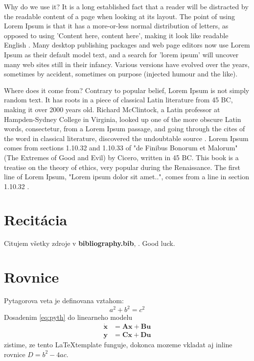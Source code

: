 Why do we use it? It is a long established fact that a reader will be distracted by the readable content of a page when looking at its layout. The point of using Lorem Ipsum is that it has a more-or-less normal distribution of letters, as opposed to using 'Content here, content here', making it look like readable English \cite{lipsum}. Many desktop publishing packages and web page editors now use Lorem Ipsum as their default model text, and a search for 'lorem ipsum' will uncover many web sites still in their infancy. Various versions have evolved over the years, sometimes by accident, sometimes on purpose (injected humour and the like).

Where does it come from? Contrary to popular belief, Lorem Ipsum is not simply random text. It has roots in a piece of classical Latin literature from 45 BC, making it over 2000 years old. Richard McClintock, a Latin professor at Hampden-Sydney College in Virginia, looked up one of the more obscure Latin words, consectetur, from a Lorem Ipsum passage, and going through the cites of the word in classical literature, discovered the undoubtable source \cite{lipsum}. Lorem Ipsum comes from sections 1.10.32 and 1.10.33 of "de Finibus Bonorum et Malorum" (The Extremes of Good and Evil) by Cicero, written in 45 BC. This book is a treatise on the theory of ethics, very popular during the Renaissance. The first line of Lorem Ipsum, "Lorem ipsum dolor sit amet..", comes from a line in section 1.10.32 \cite{lipsum}.

\section{Recitácia}
Citujem všetky zdroje v \textbf{bibliography.bib}, \cite{t00, t01, t02, t03, kniha, kniha2, kniha3, small, big, cs, koll, kap, tug, knuth, zbornik, prispevok}. \newline Good luck.

\section{Rovnice}
Pytagorova veta je definovana vztahom:
\begin{equation}
    a^2 + b^2 = c^2
    \label{eq:pyth}
\end{equation}
Dosadenim \eqref{eq:pyth} do linearneho modelu
\begin{align}
    \dot{\mathbf{x}} &= \mathbf{A} \mathbf{x} + \mathbf{B} \mathbf{u} \\
    \mathbf{y} &= \mathbf{C} \mathbf{x} + \mathbf{D} \mathbf{u}
    \label{eq:model}
\end{align}
zistime, ze tento \LaTeX template funguje, dokonca mozeme vkladat aj inline rovnice $D = b^2 - 4ac$.


